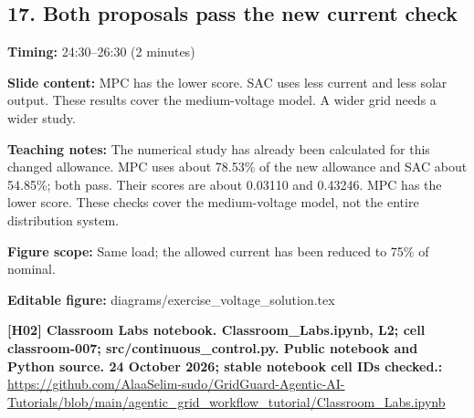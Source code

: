 \documentclass[10pt,letterpaper]{article}
\begin{document}
\subsection*{17. Both proposals pass the new current check}
\textbf{Timing:} 24:30--26:30 (2 minutes)\par
\textbf{Slide content:} MPC has the lower score. SAC uses less current and less solar output.
These results cover the medium-voltage model. A wider grid needs a wider study.\par
\textbf{Teaching notes:} The numerical study has already been calculated for this changed allowance. MPC uses about 78.53\% of the new allowance and SAC about 54.85\%; both pass. Their scores are about 0.03110 and 0.43246. MPC has the lower score. These checks cover the medium-voltage model, not the entire distribution system.\par
\textbf{Figure scope:} Same load; the allowed current has been reduced to 75\% of nominal.\par
\textbf{Editable figure:} diagrams/exercise\_voltage\_solution.tex\par
\textbf{[H02] Classroom Labs notebook. Classroom\_Labs.ipynb, L2; cell classroom-007; src/continuous\_control.py. Public notebook and Python source. 24 October 2026; stable notebook cell IDs checked.:} \href{https://github.com/AlaaSelim-sudo/GridGuard-Agentic-AI-Tutorials/blob/main/agentic_grid_workflow_tutorial/Classroom_Labs.ipynb}{\small\ttfamily https:/\allowbreak{}/\allowbreak{}github.\allowbreak{}com/\allowbreak{}AlaaSelim-\allowbreak{}sudo/\allowbreak{}GridGuard-\allowbreak{}Agentic-\allowbreak{}AI-\allowbreak{}Tutorials/\allowbreak{}blob/\allowbreak{}main/\allowbreak{}agentic\_\allowbreak{}grid\_\allowbreak{}workflow\_\allowbreak{}tutorial/\allowbreak{}Classroom\_\allowbreak{}Labs.\allowbreak{}ipynb}\par
\par\medskip
\end{document}
